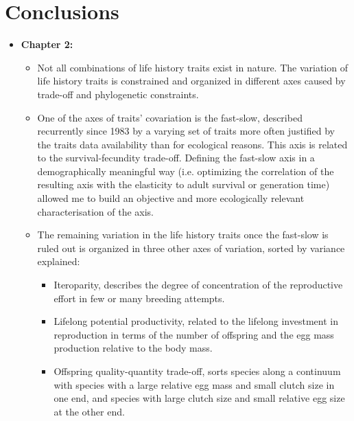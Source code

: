 \section*{Conclusions}

\begin{itemize}
  \item \textbf{Chapter 2:}
  \begin{itemize}
    \item Not all combinations of life history traits exist in nature. The
variation of life history traits is constrained and organized in different
axes caused by trade-off and phylogenetic constraints.
    \item One of the axes of traits' covariation is the fast-slow, described
recurrently since 1983 by a varying set of traits more often justified by the
traits data availability than for ecological reasons. This axis is related to
the survival-fecundity trade-off. Defining the fast-slow axis in a
demographically meaningful way (i.e. optimizing the correlation of the
resulting axis with the elasticity to adult survival or generation time)
allowed me to build an objective and more ecologically relevant
characterisation of the axis.
    \item The remaining variation in the life history traits once the fast-slow
is ruled out is organized in three other axes of variation, sorted by variance
explained:

    \begin{itemize}
      \item Iteroparity, describes the degree of concentration of the
reproductive effort in few or many breeding attempts.
      \item Lifelong potential productivity, related to the lifelong investment
in reproduction in terms of the number of offspring and the egg mass production
relative to the body mass.
      \item Offspring quality-quantity trade-off, sorts species along a
continuum with species with a large relative egg mass and small clutch size in
one end, and species with large clutch size and small relative egg size at the
other end.
    \end{itemize}
  \end{itemize}



\end{itemize}
